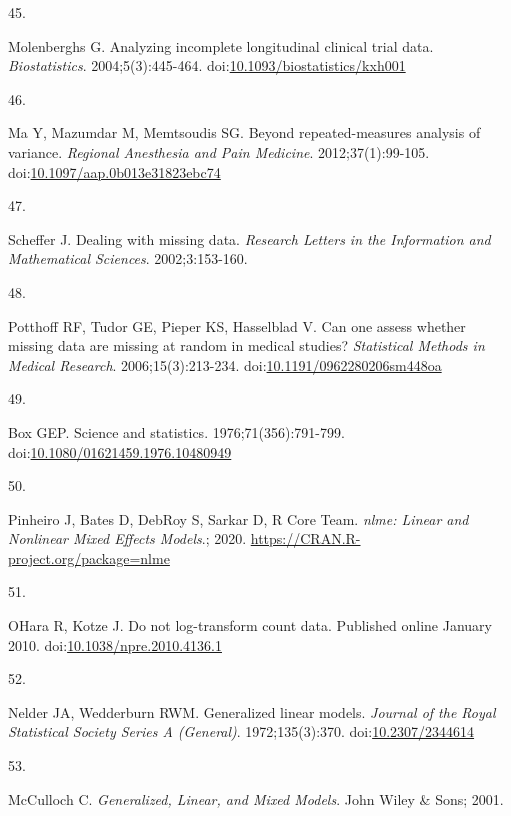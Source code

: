 \documentclass[
]{article}
\newlength{\cslhangindent}
\newlength{\csllabelwidth}
\newlength{\cslentryspacingunit} %
\newenvironment{CSLReferences}[2] %
 {%
  \setlength{\parindent}{0pt}
  \ifodd #1
  \let\oldpar\par
  \def\par{\hangindent=\cslhangindent\oldpar}
  \fi
  \setlength{\parskip}{#2\cslentryspacingunit}
 }%
 {}
\newcommand{\CSLLeftMargin}[1]{\parbox[t]{\csllabelwidth}{#1}}
\newcommand{\CSLRightInline}[1]{\parbox[t]{\linewidth - \csllabelwidth}{#1}\break}
\begin{document}
\begin{CSLReferences}{0}{0}
\leavevmode{}%
\CSLLeftMargin{45. }
\CSLRightInline{Molenberghs G. Analyzing incomplete longitudinal clinical trial data. \emph{Biostatistics}. 2004;5(3):445-464. doi:\href{https://doi.org/10.1093/biostatistics/kxh001}{10.1093/biostatistics/kxh001}}

\leavevmode{}%
\CSLLeftMargin{46. }
\CSLRightInline{Ma Y, Mazumdar M, Memtsoudis SG. Beyond repeated-measures analysis of variance. \emph{Regional Anesthesia and Pain Medicine}. 2012;37(1):99-105. doi:\href{https://doi.org/10.1097/aap.0b013e31823ebc74}{10.1097/aap.0b013e31823ebc74}}

\leavevmode{}%
\CSLLeftMargin{47. }
\CSLRightInline{Scheffer J. Dealing with missing data. \emph{Research Letters in the Information and Mathematical Sciences}. 2002;3:153-160.}

\leavevmode{}%
\CSLLeftMargin{48. }
\CSLRightInline{Potthoff RF, Tudor GE, Pieper KS, Hasselblad V. Can one assess whether missing data are missing at random in medical studies? \emph{Statistical Methods in Medical Research}. 2006;15(3):213-234. doi:\href{https://doi.org/10.1191/0962280206sm448oa}{10.1191/0962280206sm448oa}}

\leavevmode{}%
\CSLLeftMargin{49. }
\CSLRightInline{Box GEP. Science and statistics. 1976;71(356):791-799. doi:\href{https://doi.org/10.1080/01621459.1976.10480949}{10.1080/01621459.1976.10480949}}

\leavevmode{}%
\CSLLeftMargin{50. }
\CSLRightInline{Pinheiro J, Bates D, DebRoy S, Sarkar D, R Core Team. \emph{{nlme}: Linear and Nonlinear Mixed Effects Models}.; 2020. \url{https://CRAN.R-project.org/package=nlme}}

\leavevmode{}%
\CSLLeftMargin{51. }
\CSLRightInline{OHara R, Kotze J. Do not log-transform count data. Published online January 2010. doi:\href{https://doi.org/10.1038/npre.2010.4136.1}{10.1038/npre.2010.4136.1}}

\leavevmode{}%
\CSLLeftMargin{52. }
\CSLRightInline{Nelder JA, Wedderburn RWM. Generalized linear models. \emph{Journal of the Royal Statistical Society Series A (General)}. 1972;135(3):370. doi:\href{https://doi.org/10.2307/2344614}{10.2307/2344614}}

\leavevmode{}%
\CSLLeftMargin{53. }
\CSLRightInline{McCulloch C. \emph{Generalized, Linear, and Mixed Models}. John Wiley \& Sons; 2001.}


\end{CSLReferences}
\end{document}
